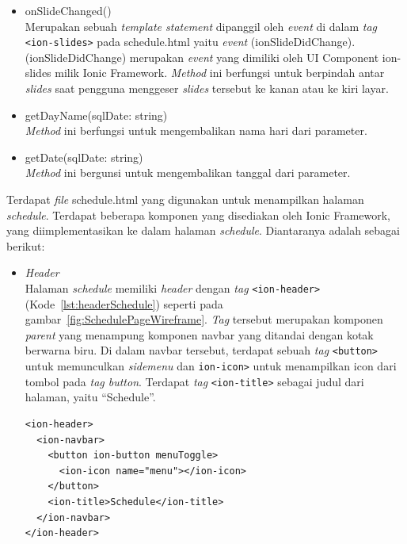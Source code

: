 \begin{enumerate}
\begin{enumerate}
\begin{itemize}
		\item onSlideChanged() \\
		Merupakan sebuah \textit{template statement} dipanggil oleh \textit{event} di dalam \textit{tag} \texttt{<ion-slides>} pada schedule.html yaitu \textit{event} (ionSlideDidChange). (ionSlideDidChange) merupakan \textit{event} yang dimiliki oleh UI Component ion-slides milik Ionic Framework. \textit{Method} ini berfungsi untuk berpindah antar \textit{slides} saat pengguna menggeser \textit{slides} tersebut ke kanan atau ke kiri layar.
		\item getDayName(sqlDate: string) \\
		\textit{Method} ini berfungsi untuk mengembalikan nama hari dari parameter.
		\item getDate(sqlDate: string) \\
		\textit{Method} ini bergunsi untuk mengembalikan tanggal dari parameter.
	\end{itemize}
	
	Terdapat \textit{file} schedule.html yang digunakan untuk menampilkan halaman \textit{schedule}. Terdapat beberapa komponen yang disediakan oleh Ionic Framework, yang diimplementasikan ke dalam halaman \textit{schedule}. Diantaranya adalah sebagai berikut:
	
	\begin{itemize}
		\item \textit{Header} \\
		Halaman \textit{schedule} memiliki \textit{header} dengan \textit{tag} \texttt{<ion-header>} (Kode~\ref{lst:headerSchedule}) seperti pada gambar~\ref{fig:SchedulePageWireframe}. \textit{Tag} tersebut merupakan komponen \textit{parent} yang menampung komponen navbar yang ditandai dengan kotak berwarna biru. Di dalam navbar tersebut, terdapat sebuah \textit{tag} \texttt{<button>} untuk memunculkan \textit{sidemenu} dan \texttt{ion-icon>} untuk menampilkan icon dari tombol pada \textit{tag button}. Terdapat \textit{tag} \texttt{<ion-title>} sebagai judul dari halaman, yaitu ``Schedule''.
		
\begin{lstlisting}[label={lst:headerSchedule}, caption=\textit{Header} pada schedule.html]
<ion-header>
  <ion-navbar>
    <button ion-button menuToggle>
      <ion-icon name="menu"></ion-icon>
    </button>
    <ion-title>Schedule</ion-title>
  </ion-navbar>
</ion-header>
\end{lstlisting} 


\end{itemize}
\end{enumerate}
\end{enumerate}
